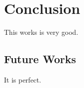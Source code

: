\chapter{Conclusion} \label{chap:ccl}
This works is very good.
\section{Future Works}
It is perfect.
\afterpage{\blankpage}
\newpage
